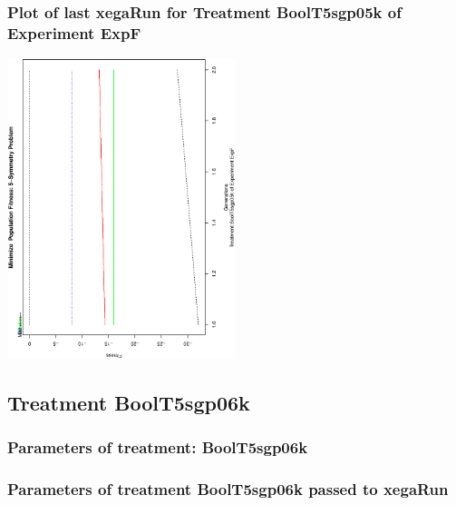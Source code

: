 \documentclass[18pt,c]{beamer}
\makeatletter
\def\beamer@writeslidentry@miniframesoff{%
  \expandafter\beamer@ifempty\expandafter{\beamer@framestartpage}{}%
  {%
   \clearpage\beamer@notesactions%
  }
}
\newcommand*{\miniframesoff}{\let\beamer@writeslidentry=\beamer@writeslidentry@miniframesoff}
\makeatother
\begin{document}
 \begin{frame}
 \frametitle{ Plot of last xegaRun for Treatment BoolT5sgp05k of Experiment ExpF }
 \begin{center}
\includegraphics[width=0.5\textwidth, angle=-90]
{ExpFPlotPopStatsFigure003.eps}
 \end{center}
 \label{report/ExpFPlotPopStatsFigure003.eps}  
 \end{frame}

\miniframesoff
\subsection{Treatment BoolT5sgp06k}

 \begin{frame}
 \fontsize{8pt}{9pt}\selectfont
 \frametitle{  Parameters of treatment: BoolT5sgp06k 
 }

 \label{ExpFtParmTable016.tex}  
 \end{frame}


 \begin{frame}
 \fontsize{8pt}{9pt}\selectfont
 \frametitle{  Parameters of treatment BoolT5sgp06k passed to xegaRun
 }

 \label{ExpFtParmTable017.tex}  
 \end{frame}
\end{document}
